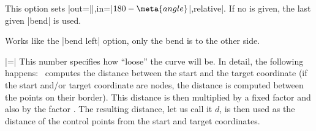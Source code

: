 \begin{itemize}
\begin{codeexample}[]
\end{codeexample}

  This option sets |out=||,in=|$180-\meta{angle}$|,relative|. If no
   is given, the last given |bend| is used. 
  
\begin{codeexample}[]
\end{codeexample}

\begin{codeexample}[]
\end{codeexample}

  Works like the |bend left| option, only the bend is to the other side.

  |=|
  This number specifies how ``loose'' the curve will be. In detail,
  the following happens: \tikzname\ computes the distance between the
  start and the target coordinate (if the start and/or target
  coordinate are nodes, the distance is computed between the points on
  their border). This distance is then multiplied by a fixed factor
  and also by the factor . The resulting distance, let us
  call it $d$, is then used as the distance of the control points from
  the start and target coordinates.


\end{itemize}

